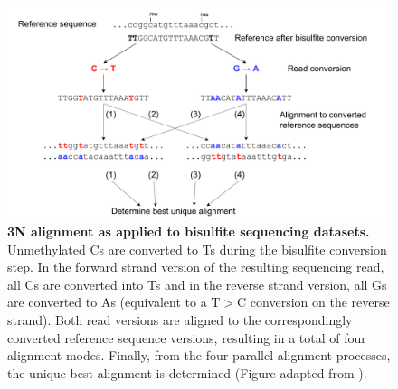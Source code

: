\begin{figure}[h]
	 \centering
	 \includegraphics[width=1.0\linewidth]{img/chapter1/3N}
	  \caption[3N alignment as applied to bisulfite sequencing datasets]{\textbf{3N alignment as applied to bisulfite sequencing datasets.} Unmethylated Cs are converted to Ts during the bisulfite conversion step. In the forward strand version of the resulting sequencing read, all Cs are converted into Ts and in the reverse  strand version, all Gs are converted to As (equivalent to a T$>$C conversion on the reverse strand). Both read versions are aligned to the correspondingly converted reference sequence versions, resulting in a total of four alignment modes. Finally, from the four parallel alignment processes, the unique best alignment is determined (Figure adapted from \citeauthor{Krueger2011} \citep{Krueger2011}).}
	 \label{fig:3n}
\end{figure}

